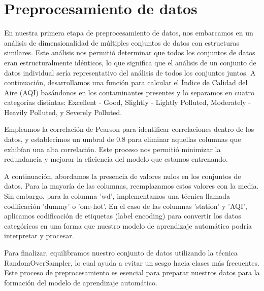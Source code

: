 \section{Preprocesamiento de datos}

En nuestra primera etapa de preprocesamiento de datos, nos embarcamos en un análisis de dimensionalidad de múltiples conjuntos de datos con estructuras similares. Este análisis nos permitió determinar que todos los conjuntos de datos eran estructuralmente idénticos, lo que significa que el análisis de un conjunto de datos individual sería representativo del análisis de todos los conjuntos juntos. A continuación, desarrollamos una función para calcular el Índice de Calidad del Aire (AQI) basándonos en los contaminantes presentes y lo separamos en cuatro categorías distintas: Excellent - Good, Slightly - Lightly Polluted, Moderately - Heavily Polluted, y Severely Polluted.\cite{liang2015beijing}

Empleamos la correlación de Pearson para identificar correlaciones dentro de los datos, y establecimos un umbral de 0.8 para eliminar aquellas columnas que exhibían una alta correlación. Este proceso nos permitió minimizar la redundancia y mejorar la eficiencia del modelo que estamos entrenando. 

A continuación, abordamos la presencia de valores nulos en los conjuntos de datos. Para la mayoría de las columnas, reemplazamos estos valores con la media. Sin embargo, para la columna 'wd', implementamos una técnica llamada codificación 'dummy' o 'one-hot'. En el caso de las columnas 'station' y 'AQI', aplicamos codificación de etiquetas (label encoding) para convertir los datos categóricos en una forma que nuestro modelo de aprendizaje automático podría interpretar y procesar.

Para finalizar, equilibramos nuestro conjunto de datos utilizando la técnica RandomOverSampler, lo cual ayuda a evitar un sesgo hacia clases más frecuentes. Este proceso de preprocesamiento es esencial para preparar nuestros datos para la formación del modelo de aprendizaje automático.\cite{liang2014hourly}
